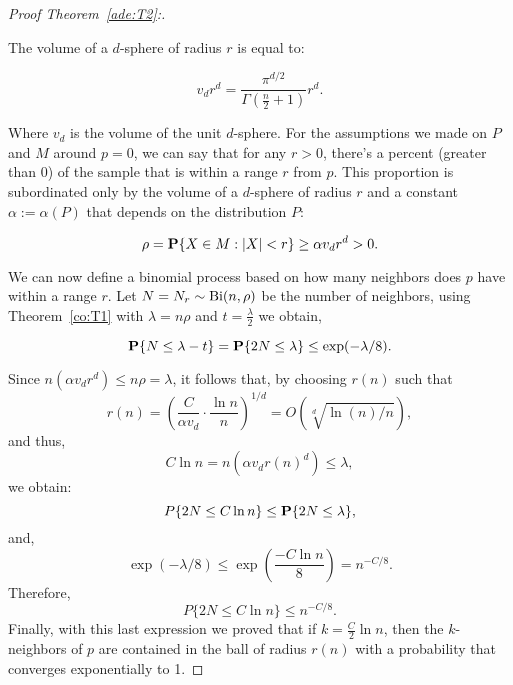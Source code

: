 \begin{proof}[Proof Theorem~\ref{ade:T2}:]\label{ade:T2P}

The volume of a $d$-sphere of radius $r$ is equal to:

\[ v_d r^d = \frac{\pi^{d/2}}{\Gamma(\tfrac{n}{2}+1)} r^d. \]

Where $v_d$ is the volume of the unit $d$-sphere. For the assumptions we made on $P$ and $M$ around $p = 0$, we can say that for any $r > 0$, there's a percent (greater than 0) of the sample that is within a range $r$ from $p$. This proportion is subordinated only by the volume of a $d$-sphere of radius $r$ and a constant $\alpha := \alpha(P)$ that depends on the distribution $P$:

\[ \rho = \P\{X \in M : |X| < r\} \geq \alpha v_d r^d  > 0.  \] 

We can now define a binomial process based on how many neighbors does $p$ have within a range $r$. Let $N = N_r \sim \Bi(n,\rho)$ be the number of neighbors, using Theorem~\ref{co:T1} with $\lambda = n\rho $ and $t = \tfrac{\lambda}{2}$ we obtain,

\[ \P\{N \leq \lambda - t\} = \P\{2N \leq \lambda \} \leq \exp(-\lambda/8). \] 

Since $n(\alpha v_d r^d) \leq n\rho = \lambda$, it follows that, by choosing $r(n)$ such that 
\[ \tag*{($\star$)} r(n) = {\left(\frac{C}{\alpha v_d} \cdot \frac{\ln n}{n} \right)}^{1/d} = O(\sqrt[d]{\ln(n)/n}),\]
and thus,
\[ C \ln n = n(\alpha v_d r{(n)}^d) \leq \lambda,\]
we obtain:
\[P\{2N \leq C \ln n \} \leq \P\{2N \leq \lambda \}, \]
and,
\[\exp(-\lambda/8)  \leq  \exp\left(\frac{-C\ln n}{8}\right) = n^{-C/8}.\]
Therefore,
\[P\{2N \leq C \ln n \} \leq  n^{-C/8}.\]
Finally, with this last expression we proved that if $k = \tfrac{C}{2}\ln n$, then the $k$-neighbors of $p$ are contained in the ball of radius $r(n)$ with a probability that converges exponentially to 1.
\end{proof}

